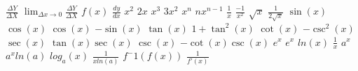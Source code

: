 \documentclass{article}
\begin{document}
$\frac{\Delta Y}{\Delta X}$
$\lim_{\Delta x \to 0} \frac{\Delta Y}{\Delta X}$
$f(x)$
$\frac{dy}{dx}$
$x^2$
$2x$
$x^3$
$3x^2$
$x^n$
$nx^{n-1}$
$\frac{1}{x}$
$\frac{-1}{x^2}$
$\sqrt{x}$
$\frac{1}{2 \sqrt{x}}$
$\sin(x)$
$\cos (x)$
$\cos(x)$
$-\sin (x)$
$\tan(x)$
$1 + \tan^2 (x)$
$\cot(x)$
$-\csc^2 (x)$
$\sec(x)$
$\tan(x) \sec(x)$
$\csc(x)$
$-\cot(x) \csc(x)$
$e^x$
$e^x$
$ln(x)$
$\frac{1}{x}$
$a^x$
$a^x ln(a)$
$log_a(x)$
$\frac{1}{x ln(a)}$
$f^-1(f(x))$
$\frac{1}{f'(x)}$
\end{document}
